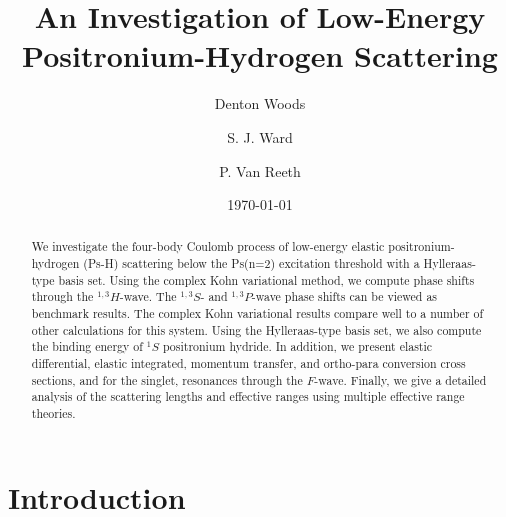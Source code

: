 \documentclass[preprint,showpacs,showkeys,preprintnumbers,amsmath,amssymb,longbibliography,pra,aps]{revtex4-1}
\begin{document}

\title{An Investigation of Low-Energy Positronium-Hydrogen Scattering}

\author{Denton Woods}

\author{S. J. Ward}

\author{P. Van Reeth}

\date{\today}

\begin{abstract}
We investigate the four-body Coulomb process of low-energy elastic
positronium-hydrogen (Ps-H) scattering below the Ps(n=2) excitation threshold
with a Hylleraas-type basis set. Using the complex Kohn variational method, we 
compute phase shifts through the $^{1,3}H$-wave. The $^{1,3}S$- and
$^{1,3}P$-wave phase shifts can be viewed as benchmark results. The complex
Kohn variational results compare well to a number of other calculations for 
this system. Using the Hylleraas-type basis set, we also compute the binding 
energy of $^1S$ positronium hydride. In addition, we present elastic 
differential, elastic integrated, momentum transfer, and ortho-para 
conversion cross sections, and for the singlet, resonances through the
$F$-wave. Finally, we give a detailed analysis of the scattering lengths and 
effective ranges using multiple effective range theories.
\end{abstract}

   
\maketitle

\section{\label{sec:Intro}\protect Introduction}


\end{document}
